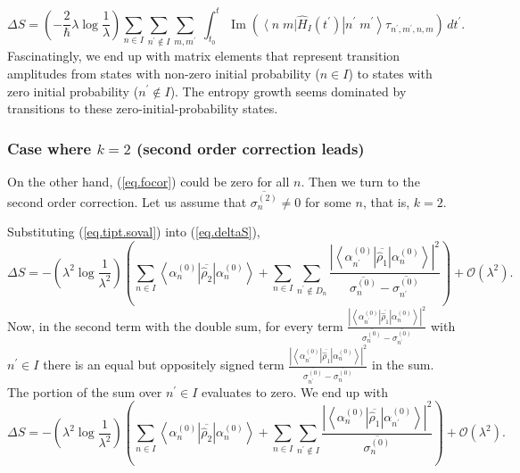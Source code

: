 \documentclass[11pt]{article}
\renewcommand{\Im}{\operatorname{Im}}
\newcommand{\Od}[1]{\mathcal{O}{\left(#1\right)}}
\newcommand{\bra}[1]{\left\langle#1\right|}
\newcommand{\ket}[1]{\left|#1\right\rangle}
\newcommand{\op}[1]{\hat{#1}}
\newcommand{\bket}[2]{\ket{#1\;#2}}
\newcommand{\bbra}[2]{\bra{#1\;#2}}
\theoremstyle{theorem}
\theoremstyle{remark}
\theoremstyle{step}
\theoremstyle{gap}
\begin{document}
\begin{equation}\label{eq.deltaS.fo}
\boxed{\Delta S = \left(-\frac{2}{\hbar}\lambda\log\frac{1}{\lambda}\right) \sum_{n \in I}\sum_{n^\prime \not\in I} \sum_{m,m^\prime}\; \int_{t_0}^t\,\Im\left( \bbra{n}{m} \op{H}_I\left(t^\prime\right) \bket{n^\prime}{m^\prime} \tau_{n^\prime, m^\prime, {n}, {m}} \right)\,dt^\prime.}
\end{equation}
Fascinatingly, we end up with matrix elements that represent transition amplitudes from states with non-zero initial probability (\(n \in I\)) to states with zero initial probability (\(n^\prime \not\in I\)). The entropy growth seems dominated by transitions to these zero-initial-probability states.



\subsubsection{Case where \(k=2\) (second order correction leads)}

On the other hand, (\ref{eq.focor}) could be zero for all \(n\). Then we turn to the second order correction. Let us assume that \(\overline{\sigma_n^{(2)}} \neq 0\) for some \(n\), that is, \(k=2\).

Substituting (\ref{eq.tipt.soval}) into (\ref{eq.deltaS}),
\[
\Delta S = -\left(\lambda^2 \log\frac{1}{\lambda^2}\right)\left(\sum_{n \in I} \bra{\alpha_n^{(0)}}\overline{\op{\rho}_2}\ket{\alpha_n^{(0)}} +  \sum_{n \in I} \sum_{{n^\prime} \not\in D_n} \frac{\left|\bra{\alpha_{n^\prime}^{(0)}} \overline{\op{\rho}_1} \ket{\alpha_n^{(0)}}\right|^2}{\overline{\sigma_n^{(0)}}-\overline{\sigma_{n^\prime}^{(0)}}} \right)+ \Od{\lambda^2}.
\]
Now, in the second term with the double sum, for every term \(\frac{\left|\bra{\alpha_{n^\prime}^{(0)}} \overline{\op{\rho}_1} \ket{\alpha_n^{(0)}}\right|^2}{\overline{\sigma_n^{(0)}}-\overline{\sigma_{n^\prime}^{(0)}}}\) with \(n^\prime \in I\) there is an equal but oppositely signed term \(\frac{\left|\bra{\alpha_{n^\prime}^{(0)}} \overline{\op{\rho}_1} \ket{\alpha_n^{(0)}}\right|^2}{\overline{\sigma_{n^\prime}^{(0)}}-\overline{\sigma_n^{(0)}}}\) in the sum. The portion of the sum over \(n^\prime \in I\) evaluates to zero. We end up with
\begin{equation}\label{eq.deltaSso.intermediate}
\Delta S = -\left(\lambda^2 \log\frac{1}{\lambda^2}\right)\left(\sum_{n \in I} \bra{\alpha_n^{(0)}}\overline{\op{\rho}_2}\ket{\alpha_n^{(0)}} +  \sum_{n \in I} \sum_{n^\prime \not\in I} \frac{\left|\bra{\alpha_{n}^{(0)}} \overline{\op{\rho}_1} \ket{\alpha_{n^\prime}^{(0)}}\right|^2}{\overline{\sigma_n^{(0)}}} \right)+ \Od{\lambda^2}.
\end{equation}
\end{document}
